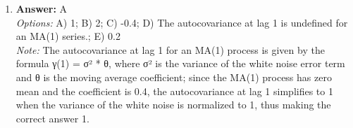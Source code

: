 \documentclass[12pt]{article}
\begin{document}
\begin{enumerate}[label=\arabic*.]
\\ \textit{Options:} A) Real GDP will decrease.; B) The unemployment rate will increase.; C) The country's trade balance will worsen.; D) The interest rate will decrease.; E) The price level will increase.
\\ \textit{Note:} The decrease in exports, despite cheaper production costs due to technology, will lead to a reduction in overall economic output, thereby resulting in a decrease in real GDP.
\item \textbf{Answer:} A
\\ \textit{Options:} A) 1; B) 2; C) -0.4; D) The autocovariance at lag 1 is undefined for an MA(1) series.; E) 0.2
\\ \textit{Note:} The autocovariance at lag 1 for an MA(1) process is given by the formula γ(1) = σ² * θ, where σ² is the variance of the white noise error term and θ is the moving average coefficient; since the MA(1) process has zero mean and the coefficient is 0.4, the autocovariance at lag 1 simplifies to 1 when the variance of the white noise is normalized to 1, thus making the correct answer 1.
\end{enumerate}
\end{document}
